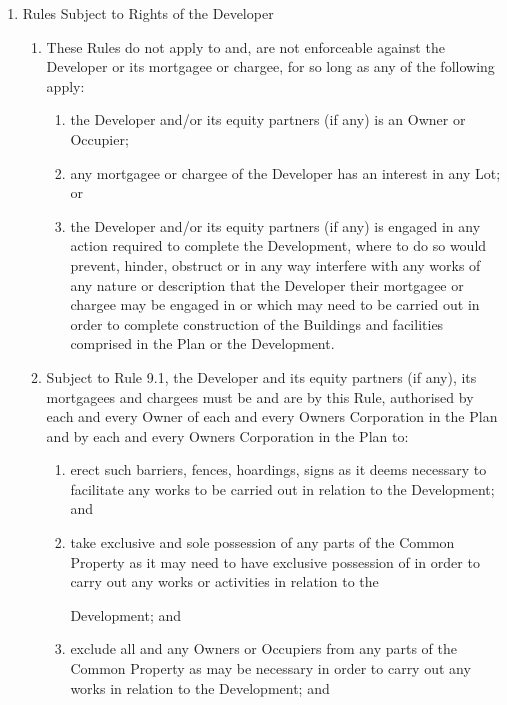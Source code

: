 \documentclass{article}
\begin{document}
\begin{enumerate}[label=\arabic*.]
\begin{enumerate}[label=\arabic{enumi}.\arabic*.]
\begin{enumerate}[label=\arabic{enumi}.\arabic*.]
\item  Rules Subject to Rights of the Developer

\begin{enumerate}[label=(\arabic*)]

\item  These Rules do not apply to and, are not enforceable against the Developer or its mortgagee or chargee, for so long as any of the following apply:

\begin{enumerate}[label=(\alph*)]

\item  the Developer and/or its equity partners (if any) is an Owner or Occupier;

\item  any mortgagee or chargee of the Developer has an interest in any Lot; or

\item  the Developer and/or its equity partners (if any) is engaged in any action required to complete the Development, where to do so would prevent, hinder, obstruct or in any way interfere with any works of any nature or description that the Developer their mortgagee or chargee may be engaged in or which may need to be carried out in order to complete construction of the Buildings and facilities comprised in the Plan or the Development.

\end{enumerate}

\item  Subject to Rule 9.1, the Developer and its equity partners (if any), its mortgagees and chargees must be and are by this Rule, authorised by each and every Owner of each and every Owners Corporation in the Plan and by each and every Owners Corporation in the Plan to:

\begin{enumerate}[label=(\alph*)]

\item  erect such barriers, fences, hoardings, signs as it deems necessary to facilitate any works to be carried out in relation to the Development; and

\item  take exclusive and sole possession of any parts of the Common Property as it may need to have exclusive possession of in order to carry out any works or activities in relation to the
\newpage

Development; and

\item  exclude all and any Owners or Occupiers from any parts of the Common Property as may be necessary in order to carry out any works in relation to the Development; and


\end{enumerate}
\end{enumerate}
\end{enumerate}
\end{enumerate}
\end{enumerate}
\end{document}
